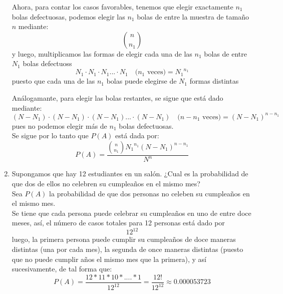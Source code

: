 \documentclass[12pt,a4paper]{report}
\begin{document}
\begin{enumerate}
{	Ahora, para contar los casos favorables, tenemos que elegir exactamente $n_1$
	bolas defectuosas, podemos elegir las $n_1$ bolas de entre la muestra de tamaño
	$n$ mediante:
		$${n}\choose{n_1}$$
	y luego, multiplicamos las formas de elegir cada una de las $n_1$ bolas de entre
	$N_1$ bolas defectuoss
		$$N_1 \cdot N_1 \cdot N_1 ... \cdot N_1 \quad \text{($n_1$ veces)}  = {N_{1}}^{n_1}$$
	puesto que cada una de las $n_1$ bolas puede elegirse de $N_1$ formas distintas

	Análogamante, para elegir las bolas restantes, se sigue que está dado mediante:
		$$(N - N_1) \cdot (N - N_1) \cdot (N - N_1) ... \cdot (N - N_1)
		  \quad \text{($n - n_1$ veces)}  =(N - N_{1})^{n - n_1}$$
	pues no podemos elegir más de $n_1$ bolas defectuosas.\\

	Se sigue por lo tanto que $P(A)$ está dada por:
		$$P(A) = \frac{{n \choose n_1} {N_{1}}^{n_1} (N - N_{1})^{n - n_1} }
				{N^n}$$
  }

  \item{
	Supongamos que hay 12 estudiantes en un salón. ¿Cual es la probabilidad de
	que dos de ellos no celebren su cumpleaños en el mismo mes?\\

	Sea $P(A)$ la probabilidad de que dos personas no celeben su cumpleaños en el
	mismo mes.\\

	Se tiene que cada persona puede celebrar su cumpleaños en uno de entre doce
	meses, así, el número de casos totales para 12 personas está dado por
		$$12^{12}$$
	luego, la primera persona puede cumplir su cumpleaños de doce maneras distintas
	(una por cada mes), la segunda de once maneras distintas (puesto que no puede
	cumplir años el mismo mes que la primera), y así sucesivamente, de tal forma
	que:
		$$P(A) = \frac{12 * 11 * 10 * .... * 1}{12^{12}} = \frac{12!}{12^{12}}
				\approx 0.000053723$$
  }





\end{enumerate}
\end{document}

